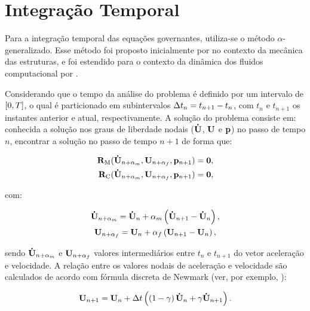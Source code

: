 \documentclass[tese_patricia]{subfiles}%
\begin{document}
\section{Integração Temporal}\label{capitulo:Cap2:IntegTemp}

Para a integração temporal das equações governantes, utiliza-se o método $\alpha$-generalizado. Esse método foi proposto inicialmente por  no contexto da mecânica das estruturas, e foi estendido para o contexto da dinâmica dos fluidos computacional por .

Considerando que o tempo da análise do problema é definido por um intervalo de $[0,T]$, o qual é particionado em subintervalos $\Delta t_{n} = t_{n+1} - t_{n}$, com $t_{n}$ e $t_{n+1}$ os instantes anterior e atual, respectivamente. A solução do problema consiste em: conhecida a solução nos graus de liberdade nodais ($\mathbf{\dot{U}}$, $\mathbf{U}$ e $\mathbf{p}$) no passo de tempo $n$, encontrar a solução no passo de tempo $n+1$ de forma que:

\begin{align}
\mathbf{R}_\mathrm{M}(\mathbf{\dot{U}}_{n+\alpha_m},\mathbf{U}_{n+\alpha_f},\mathbf{p}_{n+1}) = \mathbf{0}, \label{eq:resid_QM_alpha}\\
\mathbf{R}_\mathrm{C}(\mathbf{\dot{U}}_{n+\alpha_m},\mathbf{U}_{n+\alpha_f},\mathbf{p}_{n+1}) = \mathbf{0}, \label{eq:resid_cont_alpha}
\end{align}

\noindent com:

\begin{gather}
\mathbf{\dot{U}}_{n+\alpha_m} = \mathbf{\dot{U}}_n + \alpha_m \left( \mathbf{\dot{U}}_{n+1} - \mathbf{\dot{U}}_n \right), \label{eq:inter_acel}\\
\mathbf{U}_{n+\alpha_f} = \mathbf{U}_n + \alpha_f \left( \mathbf{U}_{n+1} - \mathbf{U}_n \right), \label{eq:inter_vel}
\end{gather}

\noindent sendo $\mathbf{\dot{U}}_{n+\alpha_m}$ e $\mathbf{U}_{n+\alpha_f}$ valores intermediários entre $t_{n}$ e $t_{n+1}$ do vetor aceleração e velocidade. A relação entre os valores nodais de aceleração e velocidade são calculados de acordo com fórmula discreta de Newmark (ver, por exemplo, \cite{Hughes:1976}):

\begin{gather}
\mathbf{U}_{n+1} = \mathbf{U}_n + \Delta t\left(\left(1-\gamma\right)\mathbf{\dot{U}}_n + \gamma\mathbf{\dot{U}}_{n+1} \right). \label{eq:Newmark}
\end{gather}
\end{document}
